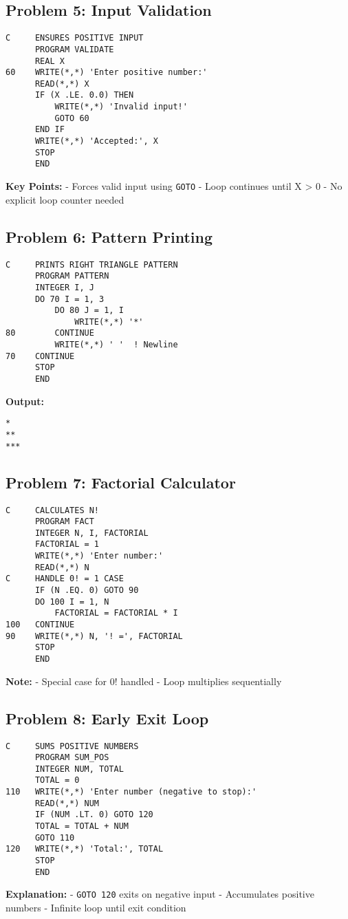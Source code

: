 \documentclass{book}
\begin{document}
\subsection*{Problem 5: Input Validation}
\begin{verbatim}
C     ENSURES POSITIVE INPUT
      PROGRAM VALIDATE
      REAL X
60    WRITE(*,*) 'Enter positive number:'
      READ(*,*) X
      IF (X .LE. 0.0) THEN
          WRITE(*,*) 'Invalid input!'
          GOTO 60
      END IF
      WRITE(*,*) 'Accepted:', X
      STOP
      END
\end{verbatim}
\textbf{Key Points:}
- Forces valid input using \texttt{GOTO}
- Loop continues until X > 0
- No explicit loop counter needed

\subsection*{Problem 6: Pattern Printing}
\begin{verbatim}
C     PRINTS RIGHT TRIANGLE PATTERN
      PROGRAM PATTERN
      INTEGER I, J
      DO 70 I = 1, 3
          DO 80 J = 1, I
              WRITE(*,*) '*'
80        CONTINUE
          WRITE(*,*) ' '  ! Newline
70    CONTINUE
      STOP
      END
\end{verbatim}
\textbf{Output:}
\begin{verbatim}
*
**
***
\end{verbatim}

\subsection*{Problem 7: Factorial Calculator}
\begin{verbatim}
C     CALCULATES N!
      PROGRAM FACT
      INTEGER N, I, FACTORIAL
      FACTORIAL = 1
      WRITE(*,*) 'Enter number:'
      READ(*,*) N
C     HANDLE 0! = 1 CASE
      IF (N .EQ. 0) GOTO 90
      DO 100 I = 1, N
          FACTORIAL = FACTORIAL * I
100   CONTINUE
90    WRITE(*,*) N, '! =', FACTORIAL
      STOP
      END
\end{verbatim}
\textbf{Note:}
- Special case for 0! handled
- Loop multiplies sequentially

\subsection*{Problem 8: Early Exit Loop}
\begin{verbatim}
C     SUMS POSITIVE NUMBERS
      PROGRAM SUM_POS
      INTEGER NUM, TOTAL
      TOTAL = 0
110   WRITE(*,*) 'Enter number (negative to stop):'
      READ(*,*) NUM
      IF (NUM .LT. 0) GOTO 120
      TOTAL = TOTAL + NUM
      GOTO 110
120   WRITE(*,*) 'Total:', TOTAL
      STOP
      END
\end{verbatim}
\textbf{Explanation:}
- \texttt{GOTO 120} exits on negative input
- Accumulates positive numbers
- Infinite loop until exit condition
\end{document}
